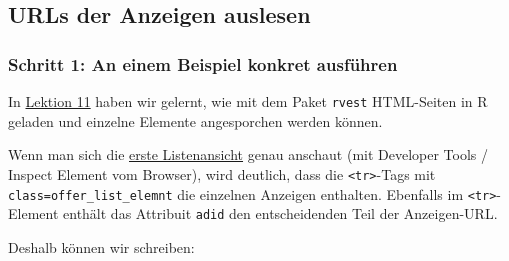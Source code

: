 \documentclass[
  ngerman,
]{article}
\begin{document}
\hypertarget{urls-der-anzeigen-auslesen}{%
\subsection{URLs der Anzeigen auslesen}\label{urls-der-anzeigen-auslesen}}

\hypertarget{schritt-1-an-einem-beispiel-konkret-ausfuxfchren}{%
\subsubsection{Schritt 1: An einem Beispiel konkret ausführen}\label{schritt-1-an-einem-beispiel-konkret-ausfuxfchren}}

In \href{../11_web_scraping/}{Lektion 11} haben wir gelernt, wie mit dem Paket \texttt{rvest} HTML-Seiten in R geladen und einzelne Elemente angesporchen werden können.

Wenn man sich die \href{https://www.wg-gesucht.de/wg-zimmer-in-Frankfurt-am-Main.41.0.0.0.html}{erste Listenansicht} genau anschaut (mit Developer Tools / Inspect Element vom Browser), wird deutlich, dass die \texttt{\textless{}tr\textgreater{}}-Tags mit \texttt{class=offer\_list\_elemnt} die einzelnen Anzeigen enthalten. Ebenfalls im \texttt{\textless{}tr\textgreater{}}-Element enthält das Attribuit \texttt{adid} den entscheidenden Teil der Anzeigen-URL.

Deshalb können wir schreiben:
\end{document}
